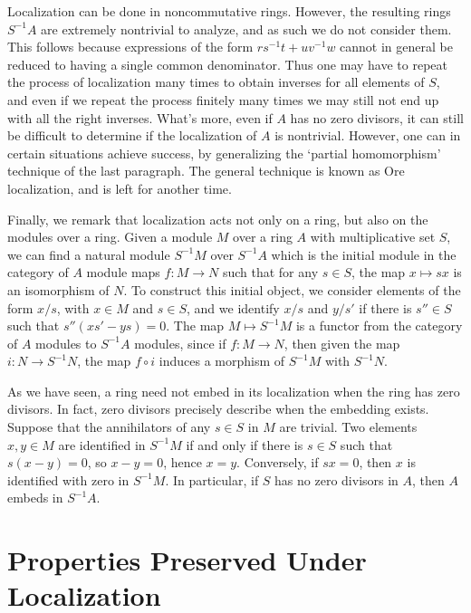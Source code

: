 \begin{remark}
Localization can be done in noncommutative rings. However, the resulting rings $S^{-1}A$ are extremely nontrivial to analyze, and as such we do not consider them. This follows because expressions of the form $rs^{-1}t + uv^{-1}w$ cannot in general be reduced to having a single common denominator. Thus one may have to repeat the process of localization many times to obtain inverses for all elements of $S$, and even if we repeat the process finitely many times we may still not end up with all the right inverses. What's more, even if $A$ has no zero divisors, it can still be difficult to determine if the localization of $A$ is nontrivial. However, one can in certain situations achieve success, by generalizing the `partial homomorphism' technique of the last paragraph. The general technique is known as Ore localization, and is left for another time.
\end{remark}

Finally, we remark that localization acts not only on a ring, but also on the modules over a ring. Given a module $M$ over a ring $A$ with multiplicative set $S$, we can find a natural module $S^{-1}M$ over $S^{-1}A$ which is the initial module in the category of $A$ module maps $f: M \to N$ such that for any $s \in S$, the map $x \mapsto sx$ is an isomorphism of $N$. To construct this initial object, we consider elements of the form $x/s$, with $x \in M$ and $s \in S$, and we identify $x/s$ and $y/s'$ if there is $s'' \in S$ such that $s''(xs' - ys) = 0$. The map $M \mapsto S^{-1}M$ is a functor from the category of $A$ modules to $S^{-1}A$ modules, since if $f: M \to N$, then given the map $i: N \to S^{-1}N$, the map $f \circ i$ induces a morphism of $S^{-1}M$ with $S^{-1}N$.

As we have seen, a ring need not embed in its localization when the ring has zero divisors. In fact, zero divisors precisely describe when the embedding exists. Suppose that the annihilators of any $s \in S$ in $M$ are trivial. Two elements $x,y \in M$ are identified in $S^{-1}M$ if and only if there is $s \in S$ such that $s(x - y) = 0$, so $x - y = 0$, hence $x = y$. Conversely, if $sx = 0$, then $x$ is identified with zero in $S^{-1}M$. In particular, if $S$ has no zero divisors in $A$, then $A$ embeds in $S^{-1}A$.

\section{Properties Preserved Under Localization}

